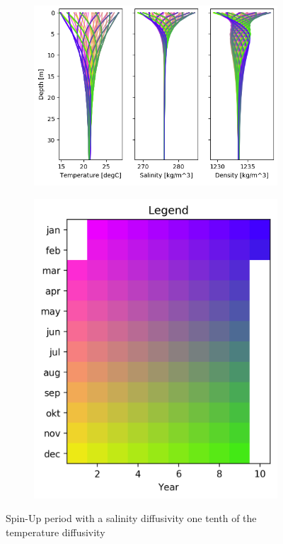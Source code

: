 \documentclass[twocolumn]{article}
\begin{document}
%
\begin{figure}
\begin{subfigure}[h]{0.65\textwidth}
\centering
\includegraphics[width=\textwidth,keepaspectratio]{SDA-01_TDA-1_SpinUp.png}
\label{fig:}
\end{subfigure}\hfill
\begin{subfigure}[h]{0.25\textwidth}
\centering
\includegraphics[width=\textwidth,keepaspectratio]{SDA-01_TDA-1_SpinUp_Legend.png}
\label{fig:}
\end{subfigure}\hfill
\caption{Spin-Up period with a salinity diffusivity one tenth of the temperature diffusivity}
\label{fig:SpinUp_dencity_balance_example}
\end{figure}
\end{document}
